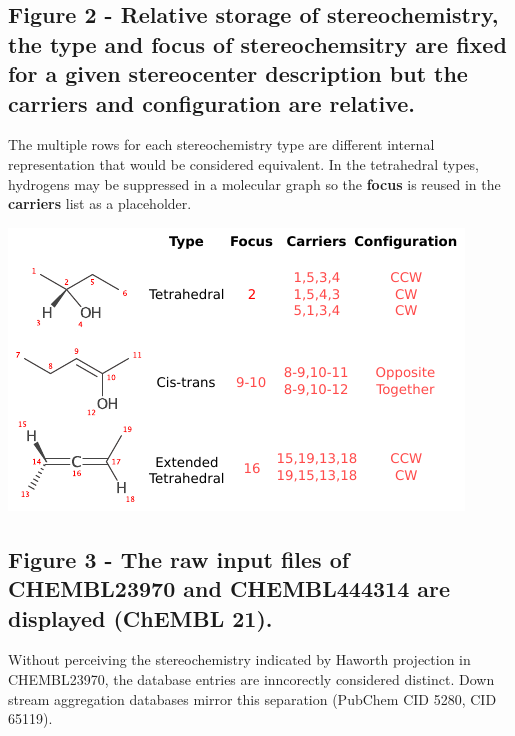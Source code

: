 \documentclass[10pt]{bmcart}
\begin{document}
\begin{backmatter}
\subsection*{Figure 2 - Relative storage of stereochemistry, the \textbf{type} and \textbf{focus} of stereochemsitry are fixed for a given stereocenter description but the \textbf{carriers} and \textbf{configuration} are relative.}\label{fig:stereodatastructure}
The multiple rows for each stereochemistry type are different internal representation that would be considered equivalent. In the tetrahedral types, hydrogens may be suppressed in a molecular graph so the \textbf{focus} is reused in the \textbf{carriers} list as a placeholder.

\includegraphics{img/stereodesc_annotated.pdf}

\subsection*{Figure 3 - The raw input files of CHEMBL23970 and CHEMBL444314 are displayed (ChEMBL 21).}\label{fig:stereoprojections}
Without perceiving the stereochemistry indicated by Haworth projection in CHEMBL23970, the database entries are inncorectly considered distinct. Down stream aggregation databases mirror this separation (PubChem CID 5280, CID 65119).


\end{backmatter}
\end{document}

